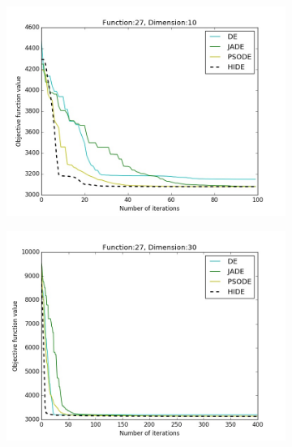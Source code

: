 \documentclass[a4paper,twoside]{article}
\begin{document}
\begin{figure}[h!]
    \begin{subfigure}[b]{0.24\textwidth}
        \includegraphics[width=\textwidth,natwidth=800,natheight=600]{plot_10D_F27_save}
        \caption{}
    \end{subfigure}
    \begin{subfigure}[b]{0.24\textwidth}
        \includegraphics[width=\textwidth,natwidth=800,natheight=600]{plot_30D_F27_save}
        \caption{}
    \end{subfigure}    
    \begin{subfigure}[b]{0.24\textwidth}

\end{subfigure}
\end{figure}
\end{document}
